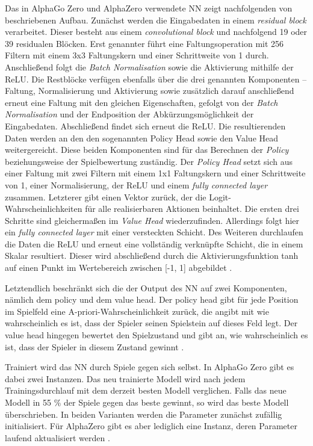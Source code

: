 \documentclass[12pt,a4paper]{article}
\begin{document}
Das in AlphaGo Zero und AlphaZero verwendete NN zeigt nachfolgenden von \cite{Silver2017} beschriebenen Aufbau.
Zunächst werden die Eingabedaten in einem \textit{residual block} verarbeitet. Dieser besteht aus einem \textit{convolutional block} und nachfolgend 19 oder 39 residualen Blöcken. Erst genannter führt eine Faltungsoperation mit 256 Filtern mit einem 3x3 Faltungskern und einer Schrittweite von 1 durch. Anschließend folgt die \textit{Batch Normalisation} sowie die Aktivierung mithilfe der ReLU. Die Restblöcke verfügen ebenfalls über die drei genannten Komponenten – Faltung, Normalisierung und Aktivierung sowie zusätzlich darauf anschließend erneut eine Faltung mit den gleichen Eigenschaften, gefolgt von der \textit{Batch Normalisation} und der Endposition der Abkürzungsmöglichkeit der Eingabedaten. Abschließend findet sich erneut die ReLU.
Die resultierenden Daten werden an den den sogenannten \glqq{}Policy Head\grqq{} sowie den \glqq{}Value Head\grqq{} weitergereicht. Diese beiden Komponenten sind für das Berechnen der \textit{Policy} beziehungsweise der Spielbewertung zuständig. Der \textit{Policy Head} setzt sich aus einer Faltung mit zwei Filtern mit einem 1x1 Faltungskern und einer Schrittweite von 1, einer Normalisierung, der ReLU und einem \textit{fully connected layer} zusammen. Letzterer gibt einen Vektor zurück, der die Logit-Wahrscheinlichkeiten für alle realisierbaren Aktionen beinhaltet.
Die ersten drei Schritte sind gleichermaßen im \textit{Value Head} wiederzufinden. Allerdings folgt hier ein \textit{fully connected layer} mit einer versteckten Schicht. Des Weiteren durchlaufen die Daten die ReLU und erneut eine vollständig verknüpfte Schicht, die in einem Skalar resultiert. Dieser wird abschließend durch die Aktivierungsfunktion tanh auf einen Punkt im Wertebereich zwischen [-1, 1] abgebildet \cite{Silver2017}.

Letztendlich beschränkt sich die der Output des NN auf zwei Komponenten, nämlich dem policy und dem value head. Der policy head gibt für jede Position im Spielfeld eine A-priori-Wahrscheinlichkeit zurück, die angibt mit wie wahrscheinlich es ist, dass der Spieler seinen Spielstein auf dieses Feld legt. Der value head hingegen bewertet den Spielzustand und gibt an, wie wahrscheinlich es ist, dass der Spieler in diesem Zustand gewinnt \cite{Silver2017}.

Trainiert wird das NN durch Spiele gegen sich selbst. In AlphaGo Zero gibt es dabei zwei Instanzen. Das neu trainierte Modell wird nach jedem Trainingsdurchlauf mit dem derzeit besten Modell verglichen. Falls das neue Modell in 55 \% der Spiele gegen das beste gewinnt, so wird das beste Modell überschrieben. In beiden Varianten werden die Parameter zunächst zufällig initialisiert. Für AlphaZero gibt es aber lediglich eine Instanz, deren Parameter laufend aktualisiert werden \cite{SilverHubert2017}. 
\end{document}
